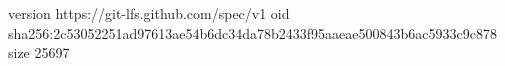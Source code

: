 version https://git-lfs.github.com/spec/v1
oid sha256:2c53052251ad97613ae54b6dc34da78b2433f95aaeae500843b6ac5933c9c878
size 25697
